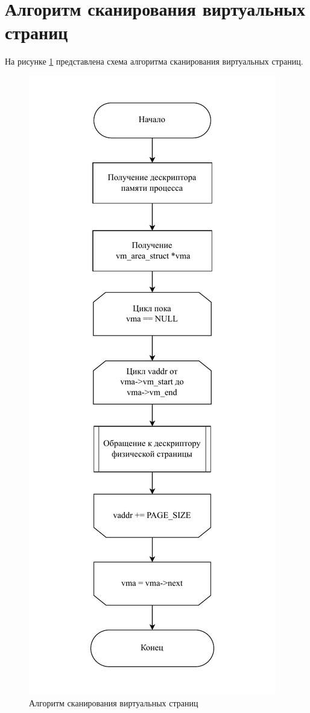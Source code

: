 \section{Алгоритм сканирования виртуальных страниц}

На рисунке \ref{img:trace_pages} представлена схема алгоритма сканирования виртуальных страниц.

\begin{figure}[H]
	\begin{center}
		\includegraphics[scale=0.75]{inc/img/trace_pages.pdf}
	\end{center}
	\captionsetup{justification=centering}
	\caption{Алгоритм сканирования виртуальных страниц}
	\label{img:trace_pages}
\end{figure}

